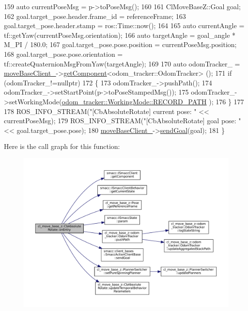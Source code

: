 \begin{DoxyCode}
159     \textcolor{keyword}{auto} currentPoseMsg = p->toPoseMsg();
160 
161     ClMoveBaseZ::Goal goal;
162     goal.target\_pose.header.frame\_id = referenceFrame;
163     goal.target\_pose.header.stamp = ros::Time::now();
164 
165     \textcolor{keyword}{auto} currentAngle = tf::getYaw(currentPoseMsg.orientation);
166     \textcolor{keyword}{auto} targetAngle = goal\_angle * M\_PI / 180.0;
167     goal.target\_pose.pose.position = currentPoseMsg.position;
168     goal.target\_pose.pose.orientation = tf::createQuaternionMsgFromYaw(targetAngle);
169 
170     \textcolor{keyword}{auto} odomTracker\_ = \hyperlink{classcl__move__base__z_1_1CbMoveBaseClientBehaviorBase_ab2ef219464cfac8659b4a87c8d0db6d5}{moveBaseClient\_}->\hyperlink{classsmacc_1_1ISmaccClient_adef78db601749ca63c19e74a27cb88cc}{getComponent}<odom\_tracker::OdomTracker>
      ();
171     \textcolor{keywordflow}{if} (odomTracker\_!=\textcolor{keyword}{nullptr})
172     \{
173         odomTracker\_->pushPath();
174         odomTracker\_->setStartPoint(p->toPoseStampedMsg());
175         odomTracker\_->setWorkingMode(\hyperlink{namespacecl__move__base__z_1_1odom__tracker_ac46b05813b2791604f6cd0a39ace3ef8a023bc3adf68871ef7a0c616765ac80a7}{odom\_tracker::WorkingMode::RECORD\_PATH}
      );
176     \}
177 
178     ROS\_INFO\_STREAM(\textcolor{stringliteral}{"[CbAbsoluteRotate] current pose: "} << currentPoseMsg);
179     ROS\_INFO\_STREAM(\textcolor{stringliteral}{"[CbAbsoluteRotate] goal pose: "} << goal.target\_pose.pose);
180     \hyperlink{classcl__move__base__z_1_1CbMoveBaseClientBehaviorBase_ab2ef219464cfac8659b4a87c8d0db6d5}{moveBaseClient\_}->\hyperlink{classsmacc_1_1client__bases_1_1SmaccActionClientBase_a9c47a5094ac8afb01680307fe5eca922}{sendGoal}(goal);
181 \}
\end{DoxyCode}
Here is the call graph for this function\+:
\nopagebreak
\begin{figure}[H]
\begin{center}
\leavevmode
\includegraphics[width=350pt]{classcl__move__base__z_1_1CbAbsoluteRotate_a10418ea360809fa649d295716b152b2b_cgraph}
\end{center}
\end{figure}
